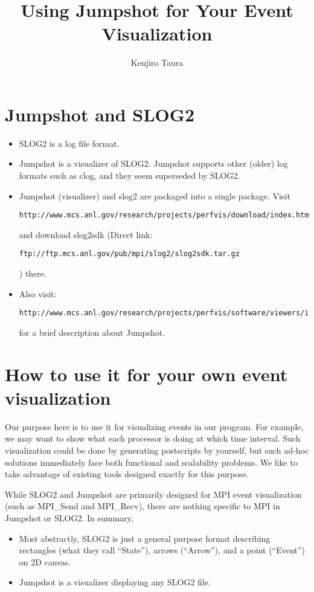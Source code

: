 \documentclass{article}
\title{Using Jumpshot for Your Event Visualization}
\author{Kenjiro Taura}
\date{}
\begin{document}
\maketitle
\section{Jumpshot and SLOG2}

\begin{itemize}
\item SLOG2 is a log file format.
\item Jumpshot is a visualizer of SLOG2.  Jumpshot supports other
(older) log formats such as clog, and they seem superseded by SLOG2.
\item Jumpshot (visualizer) and slog2 are packaged into a single package.
Visit 
\begin{verbatim}
http://www.mcs.anl.gov/research/projects/perfvis/download/index.htm#slog2sdk
\end{verbatim}
and download slog2sdk 
(Direct link: 
\begin{verbatim}
ftp://ftp.mcs.anl.gov/pub/mpi/slog2/slog2sdk.tar.gz
\end{verbatim}
) there.

\item Also visit:
\begin{verbatim}
http://www.mcs.anl.gov/research/projects/perfvis/software/viewers/index.htm
\end{verbatim}
for a brief description about Jumpshot.
\end{itemize}

\section{How to use it for your own event visualization}
Our purpose here is to use it for visualizing events in our program.
For example, we may want to show what each processor is doing at which time interval.
Such visualization could be done by generating postscripts by yourself, but such ad-hoc
solutions immediately face both functional and scalability problems.  
We like to take advantage of existing tools designed exactly for this purpose.

While SLOG2 and Jumpshot are primarily designed for MPI event visualization (such
as MPI\_Send and MPI\_Recv), there are nothing specific to MPI in Jumpshot or SLOG2.
In summary, 
\begin{itemize}
\item Most abstractly, SLOG2 is just a general purpose format 
describing rectangles (what they call ``State''),
arrows (``Arrow''), and a point (``Event'') on 2D canvas.
\item Jumpshot is a visualizer displaying any SLOG2 file.
\end{itemize}
\end{document}
